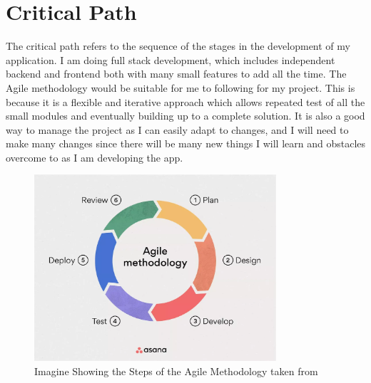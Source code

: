 \pagebreak

\section{Critical Path}
The critical path refers to the sequence of the stages in the development of my application. I am doing full stack development, which includes independent backend and frontend both with many small features to add all the time. The Agile methodology would be suitable for me to following for my project. This is because it is a flexible and iterative approach which allows repeated test of all the small modules and eventually building up to a complete solution. It is also a good way to manage the project as I can easily adapt to changes, and I will need to make many changes since there will be many new things I will learn and obstacles overcome to as I am developing the app.

\bigskip

\begin{figure}[H]
    \centering
    \includegraphics[width=0.8\textwidth]{Assets/Agile_asana.png}
    \caption{Imagine Showing the Steps of the Agile Methodology taken from \cite{laoyan2024agile}}
    \label{fig:critical_path}
\end{figure}